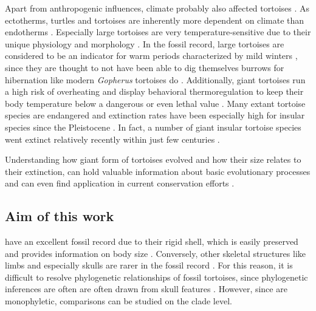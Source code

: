 Apart from anthropogenic influences, climate probably also affected tortoises \citep{.}. 
As ectotherms, turtles and tortoises are inherently more dependent on climate than endotherms \citep{Delfino2003}. Especially large tortoises are very temperature-sensitive due to their unique physiology and morphology \citep{Swingland1979a, Swingland1979b}. In the fossil record, large tortoises are considered to be an indicator for warm periods characterized by mild winters \citep{Hibbard1960,Schleich1981}, since they are thought to not have been able to dig themselves burrows for hibernation like modern \textit{Gopherus} tortoises do %
\citep{Carlson1999, Stojanov2009}. Additionally, giant tortoises run a high risk of overheating and display behavioral thermoregulation to keep their body temperature below a dangerous or even lethal value \citep{Sturbaum1982, Schleich1981}.
Many extant tortoise species are endangered and extinction rates have been especially high for insular species since the Pleistocene \citep{Rhodin2015}.
In fact, a number of giant insular tortoise species went extinct relatively recently within just few centuries \citep{.}.

Understanding how giant form of tortoises evolved and how their size relates to their extinction, can hold valuable information about basic evolutionary processes and can even find application in current conservation efforts \citep{.}.




 

\subsection{Aim of this work}

\T have an excellent fossil record due to their rigid shell, which is easily preserved and provides information on body size \citep{.}. Conversely, other skeletal structures like limbs and especially skulls are rarer in the fossil record \citep{.}.
For this reason, it is difficult to resolve phylogenetic relationships of fossil tortoises, since phylogenetic inferences are often are often drawn from skull features \citep{.}. However, since \T are monophyletic, comparisons can be studied on the clade level.

